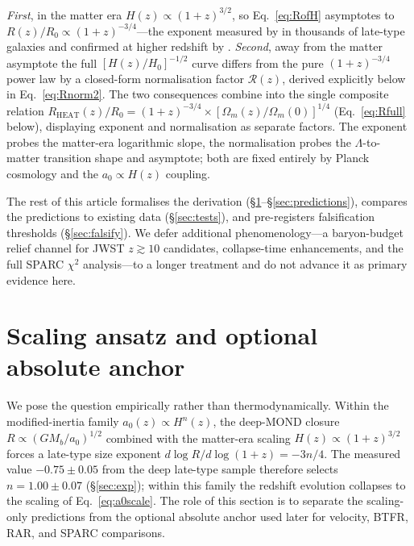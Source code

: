\documentclass[twocolumn,letterpaper]{aastex631}
\newcommand{\azero}{a_0}
\newcommand{\heat}{\mathrm{HEAT}}
\begin{document}
\emph{First}, in the matter era
$H(z)\propto(1+z)^{3/2}$, so Eq.~\ref{eq:RofH} asymptotes to
$R(z)/R_{0}\propto(1+z)^{-3/4}$---the exponent measured by
\citet{vanderWel2014} in thousands of late-type galaxies and
confirmed at higher redshift by \citet{Allen2017}.
\emph{Second}, away from the matter asymptote the full
$[H(z)/H_{0}]^{-1/2}$ curve differs from the pure $(1+z)^{-3/4}$
power law by a closed-form normalisation factor
$\mathcal{R}(z)$, derived explicitly below in
Eq.~\ref{eq:Rnorm2}.  The two consequences combine into the
single composite relation
$R_{\heat}(z)/R_{0}=(1+z)^{-3/4}\times[\Omega_{m}(z)/\Omega_{m}(0)]^{1/4}$
(Eq.~\ref{eq:Rfull} below), displaying exponent and normalisation
as separate factors.  The exponent probes the matter-era
logarithmic slope, the normalisation probes the
$\Lambda$-to-matter transition shape and asymptote; both are
fixed entirely by Planck cosmology and the $\azero\propto H(z)$
coupling.

The rest of this article formalises the derivation
(\S\ref{sec:ansatz}--\S\ref{sec:predictions}), compares the
predictions to existing data (\S\ref{sec:tests}), and
pre-registers falsification thresholds (\S\ref{sec:falsify}).
We defer additional phenomenology---a baryon-budget relief
channel for JWST $z\gtrsim 10$ candidates, collapse-time
enhancements, and the full SPARC $\chi^2$ analysis---to a longer
treatment and do not advance it as primary evidence here.

\section{Scaling ansatz and optional absolute anchor}\label{sec:ansatz}

We pose the question empirically rather than thermodynamically.
Within the modified-inertia family
$\azero(z)\propto H^{n}(z)$, the deep-MOND closure
$R\propto(GM_b/\azero)^{1/2}$ \citep{Milgrom1983,FamaeyMcGaugh2012}
combined with the matter-era scaling
$H(z)\propto(1+z)^{3/2}$ forces a late-type size exponent
$d\log R/d\log(1+z)=-3n/4$.  The measured value
$-0.75\!\pm\!0.05$ from the deep \citet{vanderWel2014}
late-type sample therefore selects
$n=1.00\!\pm\!0.07$ (\S\ref{sec:exp}); within this family the
redshift evolution collapses to the scaling of Eq.~\ref{eq:a0scale}.
The role of this section is to separate the scaling-only
predictions from the optional absolute anchor used later for
velocity, BTFR, RAR, and SPARC comparisons.
\end{document}
